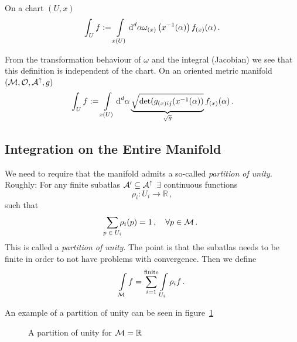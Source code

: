 \documentclass[11pt, a4paper, twocolumn]{article} %
\begin{document}
    \begin{defn}
        On a chart $(U,x)$
        \begin{equation}
            \int_U f := \int\limits_{x(U)} \operatorname{d}^d\!\alpha \omega_{(x)}\left( x^{-1}(\alpha) \right) f_{(x)}(\alpha)\,.
        \end{equation}
    \end{defn}
    From the transformation behaviour of $\omega$ and the integral (Jacobian) we see that this definition is
    independent of the chart.
    On an oriented metric manifold $(\mathcal{M}, \mathcal{O}, \mathcal{A}^\uparrow, g)$
    \begin{equation}
        \int_U f:= \int\limits_{x(U)} \operatorname{d}^d\!\alpha \underbrace{\sqrt{\det(g_{(x)ij}(x^{-1}(\alpha))}}_{\sqrt{g}} f_{(x)}(\alpha)\,.
    \end{equation}

    \subsection{Integration on the Entire Manifold}

    We need to require that the manifold admits a so-called \textit{partition of unity}.
    Roughly: For any finite subatlas $\mathcal{A}'\subseteq \mathcal{A}^\uparrow$
    $\exists$ continuous functions
    \begin{equation}
        \rho_i: U_i \to \mathbb{R}\,,
    \end{equation}
    such that
    \begin{equation}
        \sum\limits_{\mathclap{p\in U_i}} \rho_i(p) = 1\,,\quad\forall p\in \M\,.
    \end{equation}
    This is called a \textit{partition of unity}.
    The point is that the subatlas needs to be finite in order to not have problems
    with convergence.
    Then we define
    \begin{equation}
        \int\limits_{\mathcal{M}} f = \sum\limits_{i=1}^{\text{finite}}\int\limits_{U_i}\rho_i f\,.
    \end{equation}

    An example of a partition of unity can be seen in figure~\ref{fig:partitionOfUnity}

    \begin{figure}[tbh]
    \centering\def\svgwidth{\columnwidth}
    
    \caption{A partition of unity for $\mathcal{M} = \mathbb{R}$}
        \label{fig:partitionOfUnity}
    \end{figure}
\end{document}
